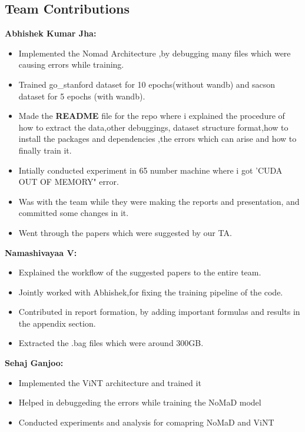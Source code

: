 \documentclass[12pt]{article}
\begin{document}
\begin{appendices}
\section{Team Contributions}
\label{app:team_contributions}
\textbf{Abhishek Kumar Jha:} \\
    \begin{itemize}
        \item Implemented the Nomad Architecture ,by debugging many files which were causing errors while training.
        \item Trained go_stanford dataset for 10 epochs(without wandb) and sacson dataset for 5 epochs (with wandb).
        \item Made the \textbf{README} file for the repo where i explained the procedure of how to extract the data,other debuggings, dataset structure format,how to install the packages and dependencies ,the errors which can arise and how to finally train it.
        \item Intially conducted experiment in 65 number machine where i got 'CUDA OUT OF MEMORY" error.
        \item Was with the team while they were making the reports and presentation, and committed some changes in it.
        \item Went through the papers which were suggested by our TA.
    \end{itemize}
    \textbf{Namashivayaa V:} \\
    \begin{itemize}
        \item Explained the workflow of the suggested papers to the entire team.
        \item Jointly worked with Abhishek,for fixing the training pipeline of the code.
        \item Contributed in report formation, by adding important formulas and results in the appendix section.
        \item Extracted the .bag files which were around 300GB.
    \end{itemize}
    \textbf{Sehaj Ganjoo:} \\
    \begin{itemize}
        \item Implemented the ViNT architecture and trained it
        \item Helped in debuggeding the errors while training the NoMaD model
        \item Conducted experiments and analysis for comapring NoMaD and ViNT

\end{itemize}
\end{appendices}
\end{document}
